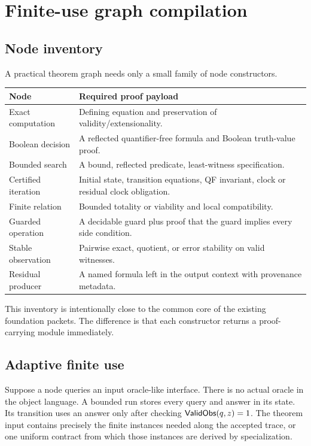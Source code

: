 
\section{Finite-use graph compilation}
\label{sec:graph}

\subsection{Node inventory}

A practical theorem graph needs only a small family of node constructors.

\begin{center}
\begin{tabularx}{\textwidth}{p{}X}
\toprule
Node & Required proof payload\\
\midrule
Exact computation &
Defining equation and preservation of validity/extensionality.\\
Boolean decision &
A reflected quantifier-free formula and Boolean truth-value proof.\\
Bounded search &
A bound, reflected predicate, least-witness specification.\\
Certified iteration &
Initial state, transition equations, QF invariant, clock or residual clock
obligation.\\
Finite relation &
Bounded totality or viability and local compatibility.\\
Guarded operation &
A decidable guard plus proof that the guard implies every side condition.\\
Stable observation &
Pairwise exact, quotient, or error stability on valid witnesses.\\
Residual producer &
A named formula left in the output context with provenance metadata.\\
\bottomrule
\end{tabularx}
\end{center}

This inventory is intentionally close to the common core of the existing
foundation packets.  The difference is that each constructor returns a
proof-carrying module immediately.

\subsection{Adaptive finite use}

Suppose a node queries an input oracle-like interface.  There is no actual
oracle in the object language.  A bounded run stores every query and answer in
its state.  Its transition uses an answer only after checking
\(\mathsf{ValidObs}(q,z)=1\).  The theorem input contains precisely the finite
instances needed along the accepted trace, or one uniform contract from which
those instances are derived by specialization.


